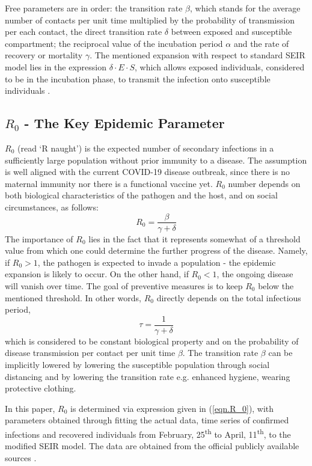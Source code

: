 \documentclass[conference]{IEEEtran}
\begin{document}
Free parameters are in order: the transition rate $\beta$, which stands for the average number of contacts per unit time multiplied by the probability of transmission per each contact, the direct transition rate $\delta$ between exposed and susceptible compartment; the reciprocal value of the incubation period $\alpha$ and the rate of recovery or mortality $\gamma$.
The mentioned expansion with respect to standard SEIR model lies in the expression $\delta \cdot E \cdot S$,  which allows exposed individuals, considered to be in the incubation phase, to transmit the infection onto susceptible individuals \cite{Wei2020}. 

\subsection{$R_0$ - The Key Epidemic Parameter}
\label{sec.modeling.R_0}
$R_0$ (read ‘R naught’) is the expected number of secondary infections in a sufficiently large population without prior immunity to a disease. The assumption is well aligned with the current COVID-19 disease outbreak, since there is no maternal immunity nor there is a functional vaccine yet.
$R_0$ number depends on both biological characteristics of the pathogen and the host, and on social circumstances, as follows: 
\begin{equation} \label{eqn.R_0}
    R_0 = \frac{\beta}{\gamma + \delta}
\end{equation}{}
The importance of $R_0$ lies in the fact that it represents somewhat of a threshold value from which one could determine the further progress of the disease. Namely, if $R_0 > 1$, the pathogen is expected to invade a population - the epidemic expansion is likely to occur. On the other hand, if $R_0 < 1$, the ongoing disease will vanish over time. The goal of preventive measures is to keep $R_0$ below the mentioned threshold.
In other words, $R_0$ directly depends on the total infectious period,
\begin{equation}
    \tau = \frac{1}{\gamma + \delta}
\end{equation}
which is considered to be constant biological property and on the probability of disease transmission per contact per unit time $\beta$. The transition rate $\beta$ can be implicitly lowered by lowering the susceptible population through social distancing and by lowering the transition rate e.g. enhanced hygiene, wearing protective clothing. 

In this paper, $R_0$ is determined via expression given in (\ref{eqn.R_0}), with parameters obtained through fitting the actual data, time series of confirmed infections and recovered individuals from February, 25\textsuperscript{th} to April, 11\textsuperscript{th}, to the modified SEIR model. The data are obtained from the official publicly available sources \cite{koronavirushr}.
\end{document}
